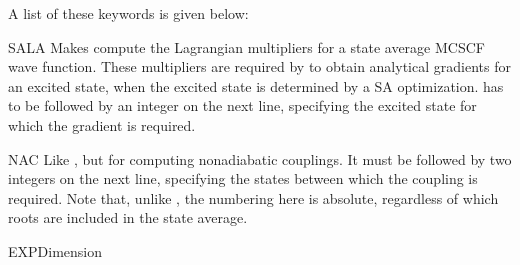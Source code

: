 A list of these keywords is given below:
\begin{keywordlist}
\item[SALA]
Makes  compute the Lagrangian multipliers for a state average
MCSCF wave function. These multipliers are required by 
to obtain analytical gradients for an excited state, when the excited
state is determined by a SA optimization.  has
to be followed by an integer on the next line, specifying the
excited state for which the gradient is required.
\item[NAC]
Like , but for computing nonadiabatic couplings. It must
be followed by two integers on the next line, specifying the states
between which the coupling is required. Note that, unlike ,
the numbering here is absolute, regardless of which roots are included
in the state average.
\item[EXPDimension]

\end{keywordlist}
